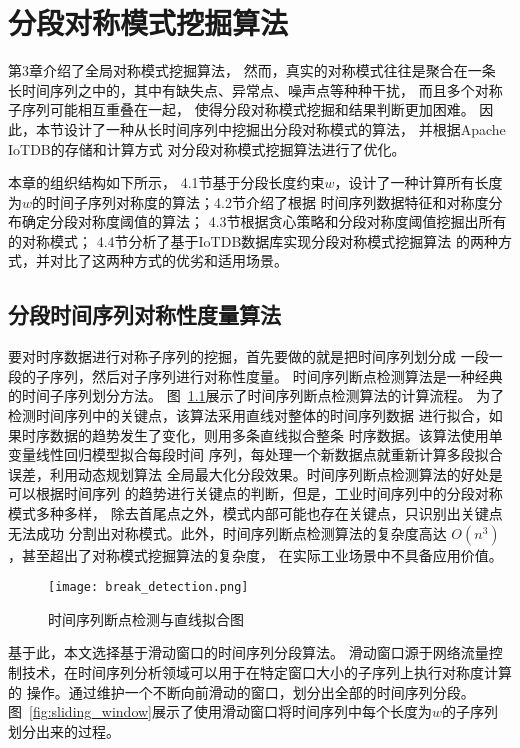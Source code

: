 
\chapter{分段对称模式挖掘算法}
第3章介绍了全局对称模式挖掘算法，
然而，真实的对称模式往往是聚合在一条
长时间序列之中的，其中有缺失点、异常点、噪声点等种种干扰，
而且多个对称子序列可能相互重叠在一起，
使得分段对称模式挖掘和结果判断更加困难。
因此，本节设计了一种从长时间序列中挖掘出分段对称模式的算法，
并根据Apache IoTDB的存储和计算方式
对分段对称模式挖掘算法进行了优化。

本章的组织结构如下所示，
4.1节基于分段长度约束$w$，设计了一种计算所有长度
为$w$的时间子序列对称度的算法；4.2节介绍了根据
时间序列数据特征和对称度分布确定分段对称度阈值的算法；
4.3节根据贪心策略和分段对称度阈值挖掘出所有的对称模式；
4.4节分析了基于IoTDB数据库实现分段对称模式挖掘算法
的两种方式，并对比了这两种方式的优劣和适用场景。

\section{分段时间序列对称性度量算法}
要对时序数据进行对称子序列的挖掘，首先要做的就是把时间序列划分成
一段一段的子序列，然后对子序列进行对称性度量。
时间序列断点检测算法是一种经典的时间子序列划分方法\cite{DBLP:conf/igarss/UrbanHZMGBMMFRH21}。
图~\ref{fig:break_detection}展示了时间序列断点检测算法的计算流程。
为了检测时间序列中的关键点，该算法采用直线对整体的时间序列数据
进行拟合，如果时序数据的趋势发生了变化，则用多条直线拟合整条
时序数据。该算法使用单变量线性回归模型拟合每段时间
序列，每处理一个新数据点就重新计算多段拟合误差，利用动态规划算法
全局最大化分段效果。时间序列断点检测算法的好处是可以根据时间序列
的趋势进行关键点的判断，但是，工业时间序列中的分段对称模式多种多样，
除去首尾点之外，模式内部可能也存在关键点，只识别出关键点无法成功
分割出对称模式。此外，时间序列断点检测算法的复杂度高达
$O\left(n^{3}\right)$，甚至超出了对称模式挖掘算法的复杂度，
在实际工业场景中不具备应用价值。
\begin{figure}
  \centering
  \texttt{[image: break\_detection.png]}
  \caption{时间序列断点检测与直线拟合图}
  \label{fig:break_detection}
\end{figure}

基于此，本文选择基于滑动窗口的时间序列分段算法\cite{DBLP:conf/pkdd/LestiS17}。
滑动窗口源于网络流量控制技术，在时间序列分析领域可以用于在特定窗口大小的子序列上执行对称度计算的
操作。通过维护一个不断向前滑动的窗口，划分出全部的时间序列分段。
图~\ref{fig:sliding_window}展示了使用滑动窗口将时间序列中每个长度为$w$的子序列划分出来的过程。

